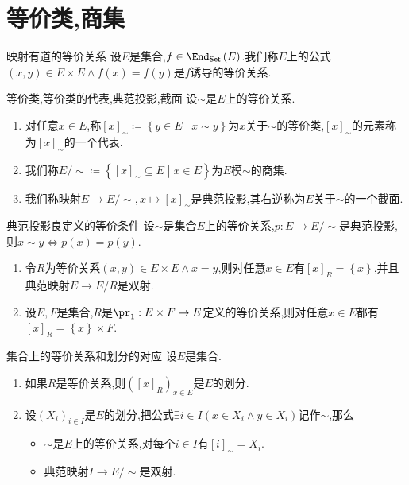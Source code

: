 \section{等价类,商集}

\begin{definition}{映射有道的等价关系}{}
	设$E$是集合,$f\in\End_{\mathsf{Set}}\left(E\right)$.我们称$E$上的公式$\left(x,y\right)\in E\times E\wedge f\left(x\right)=f\left(y\right)$是$f$诱导的等价关系.
\end{definition}

\begin{definition}{等价类,等价类的代表,典范投影,截面}{}
	设$\sim$是$E$上的等价关系.
	\begin{enumerate}
		\item 对任意$x\in E$,称$\left[x\right]_{\sim}\coloneq\left\{y\in E\middle|x\sim y\right\}$为$x$关于$\sim$的等价类,$\left[x\right]_{\sim}$的元素称为$\left[x\right]_{\sim}$的一个代表.
		\item 我们称$E/\sim\coloneq\left\{\left[x\right]_{\sim}\subseteq E\middle|x\in E\right\}$为$E$模$\sim$的商集.
		\item 我们称映射$E\to E/\sim,x\mapsto\left[x\right]_{\sim}$是典范投影,其右逆称为$E$关于$\sim$的一个截面.
	\end{enumerate}
\end{definition}

\begin{metatheorem}{典范投影良定义的等价条件}{}
	设$\sim$是集合$E$上的等价关系,$p:E\to E/\sim$是典范投影,则$x\sim y\iff p\left(x\right)=p\left(y\right)$.
\end{metatheorem}

\begin{example}{}{}
	\begin{enumerate}
		\item 令$R$为等价关系$\left(x,y\right)\in E\times E\wedge x=y$,则对任意$x\in E$有$\left[x\right]_{R}=\left\{x\right\}$,并且典范映射$E\to E/R$是双射.
		\item 设$E,F$是集合,$R$是$\pr_{1}:E\times F\to E$定义的等价关系,则对任意$x\in E$都有$\left[x\right]_{R}=\left\{x\right\}\times F$.
	\end{enumerate}
\end{example}

\begin{proposition}{集合上的等价关系和划分的对应}{}
	设$E$是集合.
	\begin{enumerate}
		\item 如果$R$是等价关系,则$\left(\left[x\right]_{R}\right)_{x\in E}$是$E$的划分.
		\item 设$\left(X_{i}\right)_{i\in I}$是$E$的划分,把公式$\exists i\in I\left(x\in X_{i}\wedge y\in X_{i}\right)$记作$\sim$,那么
		\begin{itemize}
			\item $\sim$是$E$上的等价关系,对每个$i\in I$有$\left[i\right]_{\sim}=X_{i}$.
			\item 典范映射$I\to E/\sim$是双射.
		\end{itemize}
	\end{enumerate}
\end{proposition}

